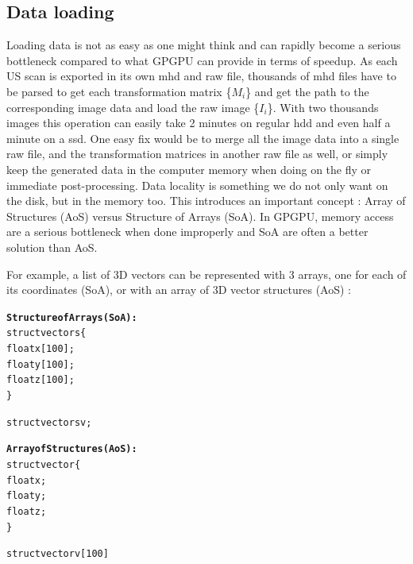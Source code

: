 \documentclass[12pt,journal,compsoc]{IEEEtran}
\begin{document}
\newpage
\subsection{Data loading}

Loading data is not as easy as one might think and can rapidly become a serious bottleneck compared to what GPGPU can provide in terms of speedup. 
As each US scan is exported in its own mhd and raw file, thousands of mhd files have to be parsed to get each transformation matrix \{$M_i$\} and get the path to the corresponding image data and load the raw image \{$I_i$\}.  
With two thousands images this operation can easily take 2 minutes on regular \ac{hdd} and even half a minute on a \ac{ssd}.
One easy fix would be to merge all the image data into a single raw file, and the transformation matrices in another raw file as well, or simply keep the generated data in the computer memory when doing on the fly or immediate post-processing.
Data locality is something we do not only want on the disk, but in the memory too. This introduces an important concept : Array of Structures (AoS) versus Structure of Arrays (SoA). In GPGPU, memory access are a serious bottleneck when done improperly and SoA are often a better solution than AoS. 

For example, a list of 3D vectors can be represented with 3 arrays, one for each of its coordinates (SoA), or with an array of 3D vector structures (AoS) :

\begin{samepage}
\begin{alltt}
\textbf{Structure of Arrays (SoA):}
struct vectors \{
    float x[100];
    float y[100];
    float z[100];
\}

struct vectors v;

\textbf{Array of Structures (AoS):}
struct vector \{
    float x;
    float y;
    float z;
\}

struct vector v[100]
\end{alltt}
\end{samepage}
\end{document}
